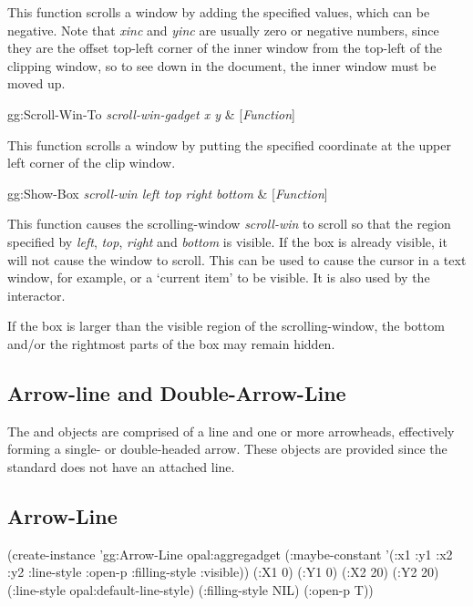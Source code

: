 This function scrolls a window by adding the specified values, which can be
negative.  Note that {\it xinc} and {\it yinc} are usually zero or negative
numbers, since they are the offset top-left corner of the inner window
from the top-left of the clipping window, so to see down in the
document, the inner window must be moved up.

\begin{programexample}
gg:Scroll-Win-To {\it scroll-win-gadget x y} & [{\it Function}]
\end{programexample}

This function scrolls a window by putting the specified coordinate at the
upper left corner of the clip window.


\begin{programexample}
gg:Show-Box {\it scroll-win left top right bottom} & [{\it Function}]
\end{programexample}

This function causes the scrolling-window {\it scroll-win} to scroll so that
the region specified by {\it left}, {\it top}, {\it right} and {\it bottom} is
visible.  If the box is already visible, it will not cause the window to
scroll.  This can be used to cause the cursor in a text window, for
example, or a `current item' to be visible.  It is also used by the
 interactor.

If the box is larger than the visible region of the scrolling-window, the
bottom and/or the rightmost parts of the box may remain hidden.




\begin{group}
\section{Arrow-line and Double-Arrow-Line}
\begin{center}
\end{center}
\end{group}

The  and  objects are comprised
of a line and one or more arrowheads, effectively forming a single- or
double-headed arrow.  These objects are provided since the standard
 does not have an attached line.

\begin{group}
\subsection{Arrow-Line}
\label{arrow-line}
\begin{programexample}
(create-instance 'gg:Arrow-Line opal:aggregadget
   (:maybe-constant '(:x1 :y1 :x2 :y2 :line-style :open-p :filling-style :visible))
   (:X1 0) (:Y1 0)
   (:X2 20) (:Y2 20)
   (:line-style opal:default-line-style)
   (:filling-style NIL)
   (:open-p T))
\end{programexample}
\end{group}

